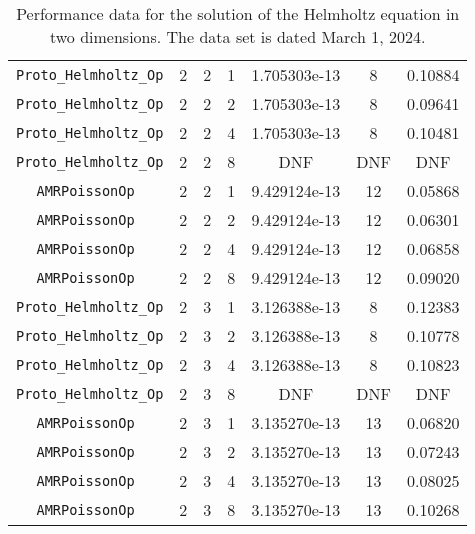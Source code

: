 \documentclass{article}
\begin{document}
\begin{small}
\begin{table}
\begin{center}
\begin{tabular}{|c|c|c|c|c|c||c|}
\hline                                                                                
 {\tt Proto\_Helmholtz\_Op} & 2 & 2   & 1    & 1.705303e-13   &   8   &  0.10884   \\
 {\tt Proto\_Helmholtz\_Op} & 2 & 2   & 2    & 1.705303e-13   &   8   &  0.09641   \\
 {\tt Proto\_Helmholtz\_Op} & 2 & 2   & 4    & 1.705303e-13   &   8   &  0.10481   \\
 {\tt Proto\_Helmholtz\_Op} & 2 & 2   & 8    & DNF   &  DNF    &  DNF   \\
\hline                                                                                
 {\tt AMRPoissonOp        } & 2 & 2   & 1    & 9.429124e-13   &  12    &  0.05868  \\
 {\tt AMRPoissonOp        } & 2 & 2   & 2    & 9.429124e-13   &  12    &  0.06301  \\
 {\tt AMRPoissonOp        } & 2 & 2   & 4    & 9.429124e-13   &  12    &  0.06858  \\
 {\tt AMRPoissonOp        } & 2 & 2   & 8    & 9.429124e-13   &  12    &  0.09020  \\
 \hline                                                                               
 {\tt Proto\_Helmholtz\_Op} & 2 & 3   & 1    & 3.126388e-13   &  8    &  0.12383   \\
 {\tt Proto\_Helmholtz\_Op} & 2 & 3   & 2    & 3.126388e-13   &  8    &  0.10778   \\
 {\tt Proto\_Helmholtz\_Op} & 2 & 3   & 4    & 3.126388e-13   &  8    &  0.10823   \\
 {\tt Proto\_Helmholtz\_Op} & 2 & 3   & 8    & DNF   &  DNF    &  DNF   \\
\hline                                                                                
 {\tt AMRPoissonOp        } & 2 & 3   & 1    &  3.135270e-13  &   13   & 0.06820   \\
 {\tt AMRPoissonOp        } & 2 & 3   & 2    &  3.135270e-13  &   13   & 0.07243   \\
 {\tt AMRPoissonOp        } & 2 & 3   & 4    &  3.135270e-13  &   13   & 0.08025   \\
 {\tt AMRPoissonOp        } & 2 & 3   & 8    &  3.135270e-13  &   13   & 0.10268   \\
 \hline
\end{tabular}
\end{center}
\label{tab::helmholtz_2d}
\caption
    {
      Performance data for the solution of the Helmholtz
      equation in two dimensions.    
      The data set is dated March 1, 2024.
    }
\end{table}
\end{small}
\end{document}

